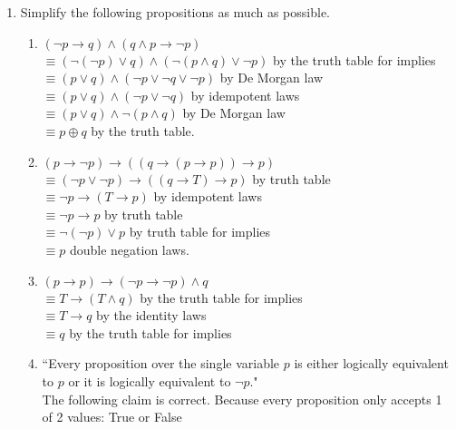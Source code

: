 \documentclass[11pt]{article}
\begin{document}
\begin{enumerate}
\newpage
\item Simplify the following propositions as much as possible.
  \begin{enumerate}
  \item $(\neg p \rightarrow q) \land (q \land p \rightarrow \neg p)
$\\
    $ \equiv (\neg(\neg p ) \lor q) \land (\neg (p \land q ) \lor \neg p)$ \qquad  by the truth table for implies\\
    $ \equiv (p \lor q) \land (\neg p \lor \neg q \lor \neg p)$   \qquad  by De Morgan law\\
    $ \equiv (p \lor q) \land (\neg p \lor \neg q)$ \qquad by idempotent laws\\
    $ \equiv (p \lor q) \land \neg (p \land q)$ \qquad by De Morgan law\\
    $\equiv p \oplus q$ \qquad by the truth table.
    
  \item $(p \rightarrow \neg p) \rightarrow ((q \rightarrow (p \rightarrow p)) \rightarrow p)$ \qquad \\
    $\equiv (\neg p \lor \neg p) \rightarrow ((q \rightarrow T) \rightarrow p)$ \qquad by truth table\\
    $\equiv \neg p \rightarrow ( T \rightarrow p)$ \qquad by idempotent laws\\
    $\equiv \neg p \rightarrow p$ \qquad by truth table\\
    $\equiv \neg (\neg p) \lor p$ \qquad by truth table for implies \\
    $\equiv p$ \qquad double negation laws.\\

  \item $(p \rightarrow p) \rightarrow (\neg p \rightarrow \neg p) \land q$ \qquad \\
  $\equiv T \rightarrow (T \land q)$ \qquad by the truth table for implies\\
  $\equiv T \rightarrow q$ \qquad by the identity laws\\
  $\equiv q$ \qquad by the truth table for implies\\
  
  \item ``Every proposition over the single variable \( p \) is either logically equivalent to \( p \) or it is logically equivalent to \( \neg p \)."\\
  The following claim is correct. Because every proposition only accepts 1 of 2 values: True or False\\


\end{enumerate}
\end{enumerate}
\end{document}
